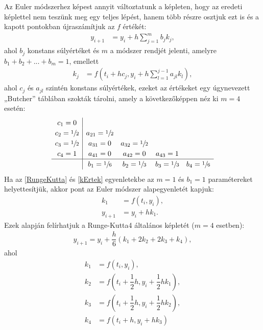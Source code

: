 Az Euler módszerhez képest annyit változtatunk a képleten, hogy az eredeti képlettel nem teszünk meg egy teljes lépést, hanem több részre osztjuk ezt is és a kapott pontokban újraszámítjuk az $f$ értékét:
\begin{align} \label{eq:RungeKutta}
	y_{i+1} &= y_{i} + h\sum_{j=1}^{m}b_{j}k_{j},
\end{align}
ahol $b_{j} $ konstans súlyértéket és $m$ a módszer rendjét jelenti, amelyre $b_{1} + b_{2}+ ... +b_{m} = 1$, emellett\\
\begin{align} \label{eq:kErtek}
	k_{j} &= f\left(t_{i}+hc_{j}, y_{i}+h \sum_{l=1}^{j-1}a_{jl}k_{l}\right),
\end{align}
ahol $c_{j} $ és $a_{jl}$ szintén konstans súlyértékek, ezeket az értékeket egy úgynevezett „Butcher” táblában szokták tárolni, amely a következőképpen néz ki $ m = 4 $ esetén: 
\[
\renewcommand\arraystretch{1.2}
\begin{array}
{c|cccc}
c_{1} = 0\\
c_{2} = \sfrac{1}{2} & a_{21} = \sfrac{1}{2}\\
c_{3} = \sfrac{1}{2} & a_{31} = 0 & a_{32} = \sfrac{1}{2} \\
c_{4} = 1 & a_{41} = 0 & a_{42} = 0 & a_{43} = 1\\
\hline
& b_{1} = \sfrac{1}{6} & b_{2} = \sfrac{1}{3} & b_{3} = \sfrac{1}{3} & b_{4} = \sfrac{1}{6} 
\end{array}
\]
Ha az \eqref{RungeKutta} és \eqref{kErtek} egyenletekbe az $m = 1$ és $b_{1} = 1$ paramétereket helyettesítjük, akkor pont az Euler módszer alapegyenletét kapjuk:
\begin{align*}
	k_{1} &= f(t_{i},y_{i}), \\
	y_{i+1} &= y_{i} + hk_{1}.
\end{align*}
Ezek alapján felírhatjuk a Runge-Kutta4 általános képletét ($m = 4$ esetben):
\begin{align}
	y_{i+1} = y_{i} + \dfrac{h}{6}(k_{1}+2k_{2}+2k_{3}+k_{4}),
\end{align}
ahol
\begin{align*}
	k_{1} &= f(t_{i},y_{i}), \\
	k_{2} &= f(t_{i}+\dfrac{1}{2}h,y_{i}+\dfrac{1}{2}hk_{1}), \\
	k_{3} &= f(t_{i}+\dfrac{1}{2}h,y_{i}+\dfrac{1}{2}hk_{2}), \\
	k_{4} &= f(t_{i}+h,y_{i}+hk_{3}) \\
\end{align*}

